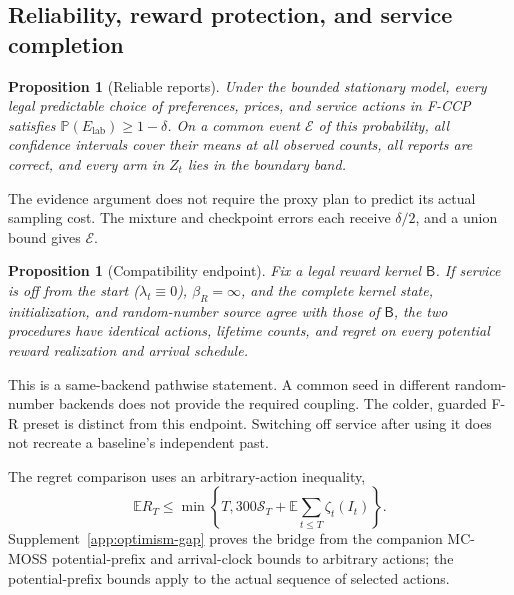 \documentclass[11pt]{article}
\newtheorem{proposition}[theorem]{Proposition}
\theoremstyle{remark}
\newcommand{\E}{\mathbb E}
\newcommand{\Prob}{\mathbb P}
\begin{document}
\FloatBarrier
\subsection{Reliability, reward protection, and service completion}
\begin{proposition}[Reliable reports]\label{prop:fccp-report}
Under the bounded stationary model, every legal predictable choice of
preferences, prices, and service actions in F-CCP satisfies
$\Prob(E_{\mathrm{lab}})\ge1-\delta$. On a common event
$\mathcal E$ of this probability, all confidence intervals cover their
means at all observed counts, all reports are correct, and every arm in
$Z_t$ lies in the boundary band.
\end{proposition}
The evidence argument does not require the proxy plan to predict its
actual sampling cost. The mixture and checkpoint errors each receive
$\delta/2$, and a union bound gives $\mathcal E$.

\begin{proposition}[Compatibility endpoint]\label{prop:fccp-compat}
Fix a legal reward kernel $\mathsf B$. If service is off from the start
($\lambda_t\equiv0$), $\beta_R=\infty$, and the complete kernel state,
initialization, and random-number source agree with those of
$\mathsf B$, the two procedures have identical actions, lifetime counts,
and regret on every potential reward realization and arrival schedule.
\end{proposition}
This is a same-backend pathwise statement. A common seed in different
random-number backends does not provide the required coupling. The
colder, guarded F-R preset is distinct from this endpoint. Switching off
service after using it does not recreate a baseline's independent past.

The regret comparison uses an arbitrary-action inequality,
\begin{equation}\label{eq:fccp-optimism}
 \E R_T\le\min\left\{T,300\mathcal S_T+
                          \E\sum_{t\le T}\zeta_t(I_t)\right\}.
\end{equation}
Supplement~\ref{app:optimism-gap} proves the bridge from the companion
MC-MOSS potential-prefix and arrival-clock bounds to arbitrary actions;
the potential-prefix bounds apply to the actual sequence of selected actions.
\end{document}
